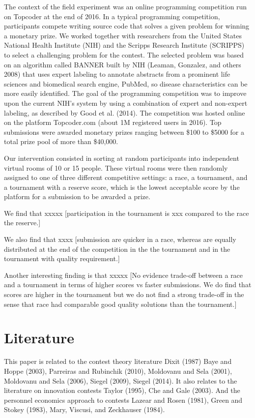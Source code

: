 \documentclass[11pt, titlepage]{article}
\begin{document}
The context of the field experiment was an online programming
competition run on Topcoder at the end of 2016. In a typical programming
competition, participants compete writing source code that solves a
given problem for winning a monetary prize. We worked together with
researchers from the United States National Health Institute (NIH) and
the Scripps Research Institute (SCRIPPS) to select a challenging problem
for the contest. The selected problem was based on an algorithm called
BANNER built by NIH (Leaman, Gonzalez, and others 2008) that uses expert
labeling to annotate abstracts from a prominent life sciences and
biomedical search engine, PubMed, so disease characteristics can be more
easily identified. The goal of the programming competition was to
improve upon the current NIH's system by using a combination of expert
and non-expert labeling, as described by Good et al. (2014). The
competition was hosted online on the platform Topcoder.com (about 1M
registered users in 2016). Top submissions were awarded monetary prizes
ranging between \$100 to \$5000 for a total prize pool of more than
\$40,000.

Our intervention consisted in sorting at random participants into
independent virtual rooms of 10 or 15 people. These virtual rooms were
then randomly assigned to one of three different competitive settings: a
race, a tournament, and a tournament with a reserve score, which is the
lowest acceptable score by the platform for a submission to be awarded a
prize.

We find that xxxxx {[}participation in the tournament is xxx compared to
the race the reserve.{]}

We also find that xxxx {[}submission are quicker in a race, whereas are
equally distributed at the end of the competition in the the tournament
and in the tournament with quality requirement.{]}

Another interesting finding is that xxxxx {[}No evidence trade-off
between a race and a tournament in terms of higher scores vs faster
submissions. We do find that scores are higher in the tournament but we
do not find a strong trade-off in the sense that race had comparable
good quality solutions than the tournament.{]}

\section{Literature}\label{literature}

This paper is related to the contest theory literature Dixit (1987) Baye
and Hoppe (2003), Parreiras and Rubinchik (2010), Moldovanu and Sela
(2001), Moldovanu and Sela (2006), Siegel (2009), Siegel (2014). It also
relates to the literature on innovation contests Taylor (1995), Che and
Gale (2003). And the personnel economics approach to contests Lazear and
Rosen (1981), Green and Stokey (1983), Mary, Viscusi, and Zeckhauser
(1984).
\end{document}
